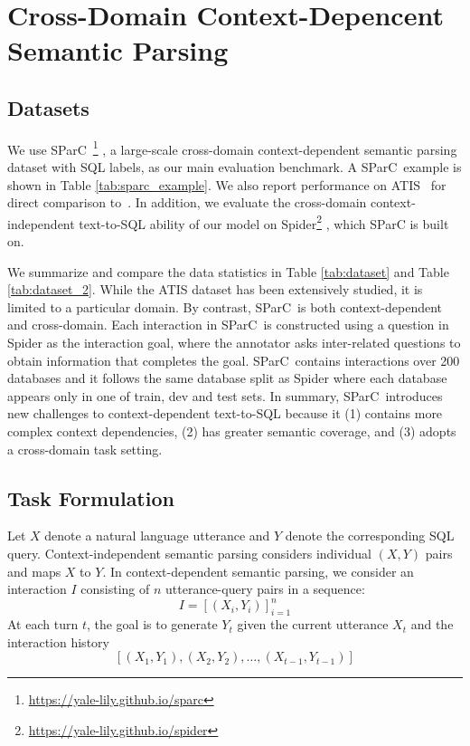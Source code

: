 \documentclass[11pt,a4paper]{article}
\newcommand{\sparc}{SParC\ }
\begin{document}
\section{Cross-Domain Context-Depencent Semantic Parsing}
\subsection{Datasets}
We use \sparc\footnote{\url{https://yale-lily.github.io/sparc}} \cite{yu2019sparc}, a large-scale cross-domain context-dependent semantic parsing dataset with SQL labels, as our main evaluation benchmark.
A \sparc example is shown in Table \ref{tab:sparc_example}.
We also report performance on ATIS~\cite{hemphill1990atis,Dahl94} for direct comparison to~.
In addition, we evaluate the cross-domain context-independent text-to-SQL ability of our model on Spider\footnote{\url{https://yale-lily.github.io/spider}} \cite{yu2018spider}, which SParC is built on.


We summarize and compare the data statistics in Table \ref{tab:dataset} and Table \ref{tab:dataset_2}.
While the ATIS dataset has been extensively studied, it is limited to a particular domain.
By contrast, \sparc is both context-dependent and cross-domain.
Each interaction in \sparc is constructed using a question in Spider as the interaction goal, where the annotator asks inter-related questions to obtain information that completes the goal.
\sparc contains interactions over 200 databases and it follows the same database split as Spider where each database appears only in one of train, dev and test sets.
In summary, \sparc introduces new challenges to context-dependent text-to-SQL because it (1) contains more complex context dependencies, (2) has greater semantic coverage, and (3) adopts a cross-domain task setting.

\subsection{Task Formulation}
Let $X$ denote a natural language utterance and $Y$ denote the corresponding SQL query.
Context-independent semantic parsing considers individual $(X,Y)$ pairs and maps $X$ to $Y$.
In context-dependent semantic parsing, we consider an interaction $I$ consisting of $n$ utterance-query pairs in a sequence: 
$$I = [(X_i,Y_i)]_{i=1}^{n}$$
At each turn $t$, the goal is to generate $Y_t$ given the current utterance $X_t$ and the interaction history 
$$[(X_1,Y_1),(X_2,Y_2),\dots,(X_{t-1},Y_{t-1})]$$
\end{document}
